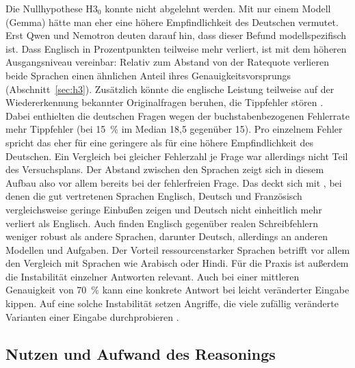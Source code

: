 \documentclass[a4paper,titlepage]{article}
\numberwithin{equation}{section} %
\begin{document}
Die Nullhypothese H3$_0$ konnte nicht abgelehnt werden. Mit nur einem Modell (Gemma) hätte man eher eine höhere Empfindlichkeit des Deutschen vermutet. Erst Qwen und Nemotron deuten darauf hin, dass dieser Befund modellspezifisch ist. Dass Englisch in Prozentpunkten teilweise mehr verliert, ist mit dem höheren Ausgangsniveau vereinbar: Relativ zum Abstand von der Ratequote verlieren beide Sprachen einen ähnlichen Anteil ihres Genauigkeitsvorsprungs (Abschnitt~\ref{sec:h3}). Zusätzlich könnte die englische Leistung teilweise auf der Wiedererkennung bekannter Originalfragen beruhen, die Tippfehler stören \citep{deng_investigating_2024}. Dabei enthielten die deutschen Fragen wegen der buchstabenbezogenen Fehlerrate mehr Tippfehler (bei 15~\% im Median 18,5 gegenüber 15). Pro einzelnem Fehler spricht das eher für eine geringere als für eine höhere Empfindlichkeit des Deutschen. Ein Vergleich bei gleicher Fehlerzahl je Frage war allerdings nicht Teil des Versuchsplans. Der Abstand zwischen den Sprachen zeigt sich in diesem Aufbau also vor allem bereits bei der fehlerfreien Frage. Das deckt sich mit \citet{zhao_evaluating_2026}, bei denen die gut vertretenen Sprachen Englisch, Deutsch und Französisch vergleichsweise geringe Einbußen zeigen und Deutsch nicht einheitlich mehr verliert als Englisch. Auch \citet{aliakbarzadeh_exploring_2025} finden Englisch gegenüber realen Schreibfehlern weniger robust als andere Sprachen, darunter Deutsch, allerdings an anderen Modellen und Aufgaben. Der Vorteil ressourcenstarker Sprachen betrifft vor allem den Vergleich mit Sprachen wie Arabisch oder Hindi. Für die Praxis ist außerdem die Instabilität einzelner Antworten relevant. Auch bei einer mittleren Genauigkeit von 70~\% kann eine konkrete Antwort bei leicht veränderter Eingabe kippen. Auf eine solche Instabilität setzen Angriffe, die viele zufällig veränderte Varianten einer Eingabe durchprobieren \citep{hughes_best--n_2024}.


\subsection{Nutzen und Aufwand des Reasonings}\label{sec:nutzen-reasoning}
\end{document}
